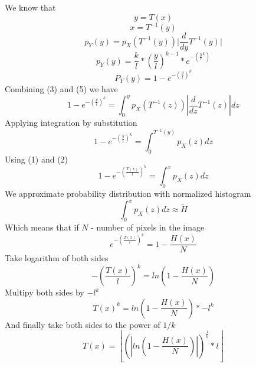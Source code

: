 \documentclass[10pt,a4paper]{article}
\begin{document}
 We know that
 \begin{equation}y=T(x)\end{equation}      
 \begin{equation}x=T^{-1}(y)\end{equation}
 \begin{equation}p_Y(y)=p_X(T^{-1}(y)) \lvert \frac{d}{dy}T^{-1}(y) \rvert\end{equation}
 \begin{equation}p_Y(y)=\frac{k}{l}*(\frac{y}{l})^{k-1}*e^{-(\frac{y}{l}^k)}\end{equation}
 \begin{equation}P_Y(y)=1-e^{-(\frac{y}{l})^k}\end{equation}
 Combining (3) and (5) we have
 \begin{equation}1-e^{-(\frac{y}{l})^k}=\int_0^y p_X(T^{-1}(z)) \left| \frac{d}{dz}T^{-1}(z)\right|dz\end{equation}
 Applying integration by substitution
 \begin{equation}1-e^{-(\frac{y}{l})^k}=\int_0^{T^{-1}(y)} p_X(z)dz\end{equation}
 Using (1) and (2)
 \begin{equation}1-e^{-(\frac{T(x)}{l})^k}=\int_0^x p_X(z)dz\end{equation}
 We approximate probability distribution with normalized histogram
 \begin{equation}\int_0^x p_X(z)dz \approx \tilde{H}\end{equation}
 Which means that if $N$ - number of pixels in the image
 \begin{equation}e^{-(\frac{T(x)}{l})^k}=1-\frac{H(x)}{N}\end{equation}
 Take logarithm of both sides
 \begin{equation}-\left(\frac{T(x)}{l}\right)^k=ln\left(1-\frac{H(x)}{N}\right)\end{equation}
 Multipy both sides by $-l^k$
 \begin{equation}T(x)^k=ln\left(1-\frac{H(x)}{N}\right)*-l^k\end{equation}
 And finally take both sides to the power of $1/k$
 \begin{equation}T(x)=\left\lfloor\left(\left|ln\left(1-\frac{H(x)}{N}\right)\right|\right)^{\frac{1}{k}}*l\right\rfloor\end{equation}
\end{document}
